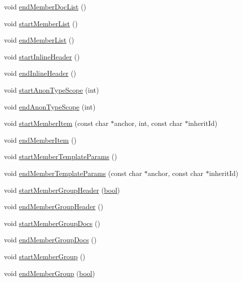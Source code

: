 \begin{DoxyCompactItemize}
\item 
void \hyperlink{class_html_generator_aadbd63f36bef8a7c5f34bf64ff656276}{end\+Member\+Doc\+List} ()
\item 
void \hyperlink{class_html_generator_a0d33ac771fd697fbc6eaf4991d340b08}{start\+Member\+List} ()
\item 
void \hyperlink{class_html_generator_abc6943cf14aadd65c338ef5664e22975}{end\+Member\+List} ()
\item 
void \hyperlink{class_html_generator_ad5d757feeb81868a9cf577256b29cdb4}{start\+Inline\+Header} ()
\item 
void \hyperlink{class_html_generator_ad6bac26d91f76820e6776ab3d8a09558}{end\+Inline\+Header} ()
\item 
void \hyperlink{class_html_generator_af9db4bdc3231e939587cce7efbc1e56e}{start\+Anon\+Type\+Scope} (int)
\item 
void \hyperlink{class_html_generator_ac6ab49e31bbc29399c976e5049fdbd2a}{end\+Anon\+Type\+Scope} (int)
\item 
void \hyperlink{class_html_generator_a47a6941c01a7eeee2002cad26423562e}{start\+Member\+Item} (const char $\ast$anchor, int, const char $\ast$inherit\+Id)
\item 
void \hyperlink{class_html_generator_ade88472c29491eace2d40696d9566ddd}{end\+Member\+Item} ()
\item 
void \hyperlink{class_html_generator_a70e7950bdda5af04b71a58bc3f6e368f}{start\+Member\+Template\+Params} ()
\item 
void \hyperlink{class_html_generator_a00ef5d813c7c390a878bde39fff5cf89}{end\+Member\+Template\+Params} (const char $\ast$anchor, const char $\ast$inherit\+Id)
\item 
void \hyperlink{class_html_generator_ad543e576da74cbcbe768b364d774f95c}{start\+Member\+Group\+Header} (\hyperlink{qglobal_8h_a1062901a7428fdd9c7f180f5e01ea056}{bool})
\item 
void \hyperlink{class_html_generator_ace78ed06d9ae28b81837172a3a5fc167}{end\+Member\+Group\+Header} ()
\item 
void \hyperlink{class_html_generator_a70302c8014e5ddb69b5d90181de906d0}{start\+Member\+Group\+Docs} ()
\item 
void \hyperlink{class_html_generator_a9881dc5213e18e6423d421326f833116}{end\+Member\+Group\+Docs} ()
\item 
void \hyperlink{class_html_generator_aec0d118a7c03a3d6a4253110e35ed48e}{start\+Member\+Group} ()
\item 
void \hyperlink{class_html_generator_a35213747d61865984f261d3fb7487e9d}{end\+Member\+Group} (\hyperlink{qglobal_8h_a1062901a7428fdd9c7f180f5e01ea056}{bool})

\end{DoxyCompactItemize}
